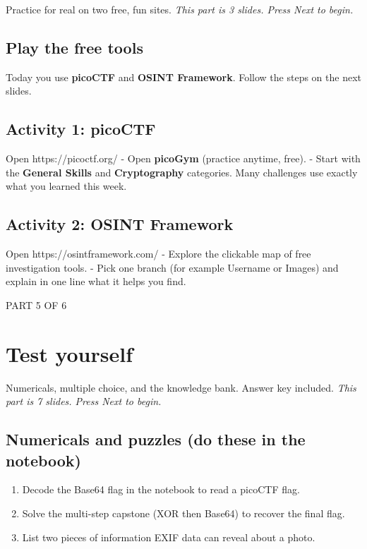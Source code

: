 \documentclass[12pt,openany]{book}
\begin{document}
Practice for real on two free, fun sites.
{\small\itshape\color{gray}This part is 3 slides. Press Next to begin.}

\medskip

\subsection*{Play the free tools}

Today you use \textbf{picoCTF} and \textbf{OSINT Framework}. Follow the steps on the next slides.

\medskip

\subsection*{Activity 1: picoCTF}


Open https://picoctf.org/
- Open \textbf{picoGym} (practice anytime, free).
- Start with the \textbf{General Skills} and \textbf{Cryptography} categories. Many challenges use exactly what you learned this week.

\medskip

\subsection*{Activity 2: OSINT Framework}


Open https://osintframework.com/
- Explore the clickable map of free investigation tools.
- Pick one branch (for example Username or Images) and explain in one line what it helps you find.

\medskip

\vspace{4pt}\noindent\textsc{PART 5 OF 6}


\section*{Test yourself}

Numericals, multiple choice, and the knowledge bank. Answer key included.
{\small\itshape\color{gray}This part is 7 slides. Press Next to begin.}

\medskip

\subsection*{Numericals and puzzles (do these in the notebook)}


\begin{enumerate}

  \item Decode the Base64 flag in the notebook to read a picoCTF flag.

  \item Solve the multi-step capstone (XOR then Base64) to recover the final flag.

  \item List two pieces of information EXIF data can reveal about a photo.

\end{enumerate}
\end{document}
